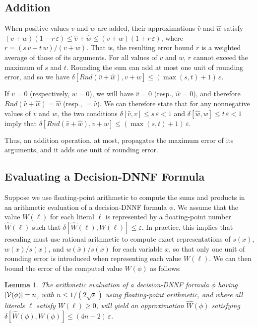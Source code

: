 \documentclass[
hf
]{ceurart}
\newcommand{\obar}[1]{\overline{#1}}
\newcommand{\lit}{\ell}
\newcommand{\approximate}[1]{\hat{#1}}
\newcommand{\approxv}{\approximate{v}}
\newcommand{\approxw}{\approximate{w}}
\newcommand{\approxW}{\approximate{W}}
\newcommand{\round}{\mathit{Rnd}}
\newcommand{\aerror}{\delta}
\newcommand{\roundepsilon}{\varepsilon}
\newcommand{\dependencyset}{{\cal V}}
\newtheorem{lemma}{Lemma}
\begin{document}
\subsection{Addition}

When positive values $v$ and $w$ are added, their approximations  $\approxv$ and $\approxw$ satisfy
$(v + w) (1 - r\,\roundepsilon) \leq \approxv + \approxw \leq (v + w) (1 + r\,\roundepsilon)$, where
$r = (s\,v + t\,w)/(v+w)$.
That is, the resulting error bound $r$ is a weighted average
of those of its arguments.  For all values of $v$ and $w$, $r$ cannot exceed the maximum of $s$ and $t$.
Rounding the sum can add at most one unit of rounding error, and so we have
$\aerror[\round(\approxv + \approxw), v + w] \leq (\max(s,t)+1)\,\roundepsilon$.

If $v = 0$ (respectively, $w = 0$), we will have $\approxv = 0$ (resp., $\approxw = 0$), and therefore $\round(\approxv + \approxw) = \approxw$ (resp., $= \approxv$).
We can therefore state that for any nonnegative values of $v$ and $w$, the two conditions $\aerror[\approxv, v] \leq s\,\roundepsilon < 1$ and
$\aerror[\approxw, w] \leq t\,\roundepsilon < 1$ imply that 
$\aerror[\round(\approxv + \approxw), v + w] \leq (\max(s,t)+1)\,\roundepsilon$.

Thus, an addition operation, at most, propagates the maximum error of its arguments, and it adds one unit of rounding error.

\subsection{Evaluating a Decision-DNNF Formula}
\label{sect:error:formula}

Suppose we use floating-point arithmetic to compute the sums and
products in an arithmetic evaluation of a decision-DNNF formula $\phi$.
We assume that the value $W(\lit)$ for each literal $\lit$ is
represented by a floating-point number $\approxW(\lit)$ such that
$\aerror[\approxW(\lit), W(\lit)] \leq \roundepsilon$.  In practice,
this implies that rescaling must use rational arithmetic to
compute exact representations of $s(x)$, $w(x)/s(x)$, and
$w(\obar{x})/s(x)$ for each variable $x$, so that only one unit of
rounding error is introduced when representing each value $W(\lit)$.
We can then bound the error of the computed value $W(\phi)$ as follows:
\begin{lemma}
  The arithmetic evaluation of a decision-DNNF formula $\phi$  having $|\dependencyset(\phi)| = n$, with
  $n \leq 1/(2\sqrt{\roundepsilon})$
  using floating-point arithmetic,
  and where all literals $\ell$ satisfy $W(\lit) \geq 0$,
  will yield an approximation $\approxW(\phi)$ satisfying
  $\aerror[\approxW(\phi), W(\phi)] \leq (4n-2)\,\roundepsilon$.
  \label{lemma:approx:pos}
\end{lemma}
\end{document}
